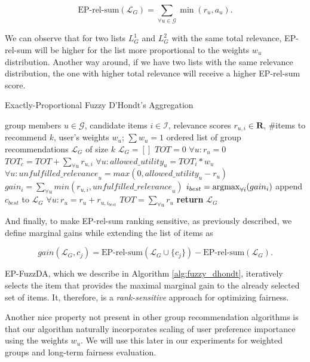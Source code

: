 \begin{equation}
    \textrm{EP-rel-sum}(\mathcal{L}_G) = \sum_{\forall u \in \mathcal{G}} \min(r_u, a_u).
\end{equation}

We can observe that for two lists $L_G^1$ and $L_G^2$ with the same total relevance, EP-rel-sum will be higher for the list more proportional to the weights $w_u$ distribution. Another way around, if we have two lists with the same relevance distribution, the one with higher total relevance will receive a higher EP-rel-sum score.

\begin{algorithm}\label{alg:fuzzy_dhondt}
    \caption{Exactly-Proportional Fuzzy D'Hondt's Aggregation}
    \begin{algorithmic}[1]
         group members $u \in \mathcal{G}$, candidate items $i \in \mathcal{I}$, relevance scores $r_{u,i} \in \mathbf{R}$, \#items to recommend $k$, user's weights $w_u$; $\sum w_u = 1$ 
         ordered list of group recommendations $\mathcal{L}_G$ of size $k$
        \vspace{1mm}
        \State $\mathcal{L}_G = []$ 
        \State $TOT = 0$
        \State $\forall u: r_u = 0$
        \vspace{1mm}
                \State $TOT_c = TOT + \sum_{\forall u} r_{u,i}$
                \State $\forall u: \mathit{allowed\_utility}_u = TOT_i * w_u$
                \State $\forall u: \mathit{unfulfilled\_relevance}_u = max(0, \mathit{allowed\_utility}_u - r_u)$
                \State $gain_i = \sum_{\forall u} min(r_{u,i}, \mathit{unfulfilled\_relevance}_u)$
            \EndFor
            \State $i_{best} = \operatorname*{argmax}_{\forall i}(gain_i)$
            \State append $c_{best}$ to $\mathcal{L}_G$
            \State  $\forall u: r_u = r_u + r_{u,i_{best}}$
            \State $TOT = \sum_{\forall u} r_u$
        \EndFor
        \State \textbf{return} $\mathcal{L}_G$ 
    \end{algorithmic}
\end{algorithm}

And finally, to make EP-rel-sum ranking sensitive, as previously described, we define marginal gains while extending the list of items as

\begin{equation}
    gain(\mathcal{L}_G, c_j) = \textrm{EP-rel-sum}(\mathcal{L}_G \cup \{c_j\}) - \textrm{EP-rel-sum}(\mathcal{L}_G).
\end{equation}

EP-FuzzDA, which we describe in Algorithm \ref{alg:fuzzy_dhondt}, iteratively selects the item that provides the maximal marginal gain to the already selected set of items. It, therefore, is a \textit{rank-sensitive} approach for optimizing fairness.

Another nice property not present in other group recommendation algorithms is that our algorithm naturally incorporates scaling of user preference importance using the weights $w_u$. We will use this later in our experiments for weighted groups and long-term fairness evaluation.
